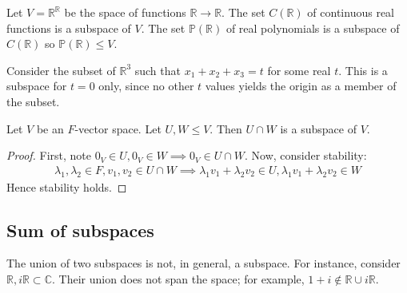 \begin{example}
    Let $V = \mathbb R^{\mathbb R}$ be the space of functions $\mathbb R \to \mathbb R$.
    The set $C(\mathbb R)$ of continuous real functions is a subspace of $V$.
    The set $\mathbb P(\mathbb{R})$ of real polynomials is a subspace of $C(\mathbb R)$ so $\mathbb{P}(\mathbb{R}) \leq V$.
\end{example}
\begin{example}
    Consider the subset of $\mathbb R^3$ such that $x_1 + x_2 + x_3 = t$ for some real $t$.
    This is a subspace for $t = 0$ only, since no other $t$ values yields the origin as a member of the subset.
\end{example}

\begin{proposition}
    Let $V$ be an $F$-vector space.
    Let $U, W \leq V$.
    Then $U \cap W$ is a subspace of $V$.
\end{proposition}
\begin{proof}
    First, note $0_V \in U, 0_V \in W \implies 0_V \in U \cap W$.
    Now, consider stability:
    \begin{align*}
        \lambda_1, \lambda_2 \in F, v_1, v_2 \in U \cap W \implies \lambda_1 v_1 + \lambda_2 v_2 \in U, \lambda_1 v_1 + \lambda_2 v_2 \in W
    \end{align*}
    Hence stability holds.
\end{proof}

\subsection{Sum of subspaces}
\begin{warning}
    The union of two subspaces is not, in general, a subspace.
    For instance, consider $\mathbb R, i\mathbb R \subset \mathbb C$.
    Their union does not span the space; for example, $1 + i \notin \mathbb R \cup i\mathbb R$.
\end{warning}

